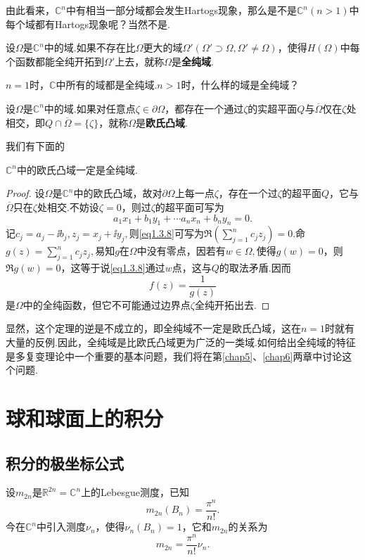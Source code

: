 由此看来，$\mathbb{C}^n$中有相当一部分域都会发生Hartogs现象，那么是不是$\mathbb{C}^n(n>1)$中每个域都有Hartogs现象呢？当然不是.
\begin{definition}\label{def1.3.8}
	设$\Omega$是$\mathbb{C}^n$中的域.如果不存在比$\Omega$更大的域$\Omega'(\Omega'\supset\Omega,\Omega'\neq\Omega)$，使得$H(\Omega)$中每个函数都能全纯开拓到$\Omega'$上去，就称$\Omega$是\textbf{全纯域}.
\end{definition}
$n=1$时，$\mathbb{C}$中所有的域都是全纯域.$n>1$时，什么样的域是全纯域？
\begin{definition}\label{def1.3.9}
	设$\Omega$是$\mathbb{C}^n$中的域.如果对任意点$\zeta\in\partial\Omega$，都存在一个通过$\zeta$的实超平面$Q$与$\overline{\Omega}$仅在$\zeta$处相交，即$Q\cap\overline{\Omega}=\{\zeta\}$，就称$\Omega$是\textbf{欧氏凸域}.
\end{definition}
我们有下面的
\begin{theorem}\label{thm1.3.10}
	$\mathbb{C}^n$中的欧氏凸域一定是全纯域.
\end{theorem}
\begin{proof}
	设$\Omega$是$\mathbb{C}^n$中的欧氏凸域，故对$\partial\Omega$上每一点$\zeta$，存在一个过$\zeta$的超平面$Q$，它与$\overline{\Omega}$只在$\zeta$处相交.不妨设$\zeta=0$，则过$\zeta$的超平面可写为
	\begin{equation}\label{eq1.3.8}
		a_1x_1+b_1y_1+\cdots a_nx_n+b_ny_n=0.
	\end{equation}
记$c_j=a_j-\ii b_j,z_j=x_j+\ii y_j,$则\eqref{eq1.3.8}可写为$\Re(\sum\limits_{j=1}^n c_jz_j)=0.$命$g(z)=\sum\limits_{j=1}^n c_j z_j,$易知$g$在$\Omega$中没有零点，因若有$w\in\Omega,$使得$g(w)=0$，则$\Re g(w)=0$，这等于说\eqref{eq1.3.8}通过$w$点，这与$Q$的取法矛盾.因而
\[f(z)=\frac1{g(z)}\]
是$\Omega$中的全纯函数，但它不可能通过边界点$\zeta$全纯开拓出去.
\end{proof}
显然，这个定理的逆是不成立的，即全纯域不一定是欧氏凸域，这在$n=1$时就有大量的反例.因此，全纯域是比欧氏凸域更为广泛的一类域.如何给出全纯域的特征是多复变理论中一个重要的基本问题，我们将在第\ref{chap5}、\ref{chap6}两章中讨论这个问题.
\section{球和球面上的积分\label{sec1.4}}
\subsection{积分的极坐标公式}
设$m_{2n}$是$\mathbb{R}^{2n}=\mathbb{C}^n$上的Lebesgue测度，已知
\[m_{2n}(B_n)=\frac{\pi^n}{n!}.\]
今在$\mathbb{C}^n$中引入测度$\nu_n$，使得$\nu_n(B_n)=1$，它和$m_{2n}$的关系为
\begin{equation}\label{eq1.4.1}
	m_{2n}=\frac{\pi^n}{n!}\nu_n.
\end{equation}

